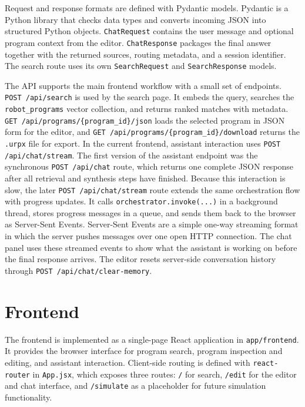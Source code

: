 Request and response formats are defined with Pydantic models. Pydantic is a Python library that checks data types and converts incoming JSON into structured Python objects. \texttt{ChatRequest} contains the user message and optional program context from the editor. \texttt{ChatResponse} packages the final answer together with the returned sources, routing metadata, and a session identifier. The search route uses its own \texttt{SearchRequest} and \texttt{SearchResponse} models.

The API supports the main frontend workflow with a small set of endpoints. \texttt{POST /api/search} is used by the search page. It embeds the query, searches the \texttt{robot\_programs} vector collection, and returns ranked matches with metadata. \verb|GET /api/programs/{program_id}/json| loads the selected program in JSON form for the editor, and \verb|GET /api/programs/{program_id}/download| returns the \texttt{.urpx} file for export. In the current frontend, assistant interaction uses \texttt{POST /api/chat/stream}. The first version of the assistant endpoint was the synchronous \texttt{POST /api/chat} route, which returns one complete JSON response after all retrieval and synthesis steps have finished. Because this interaction is slow, the later \texttt{POST /api/chat/stream} route extends the same orchestration flow with progress updates. It calls \texttt{orchestrator.invoke(...)} in a background thread, stores progress messages in a queue, and sends them back to the browser as Server-Sent Events. Server-Sent Events are a simple one-way streaming format in which the server pushes messages over one open HTTP connection. The chat panel uses these streamed events to show what the assistant is working on before the final response arrives. The editor resets server-side conversation history through \texttt{POST /api/chat/clear-memory}.


\newpage
\section{Frontend}
The frontend is implemented as a single-page React application in \texttt{app/frontend}. It provides the browser interface for program search, program inspection and editing, and assistant interaction. Client-side routing is defined with \texttt{react-router} in \texttt{App.jsx}, which exposes three routes: \texttt{/} for search, \texttt{/edit} for the editor and chat interface, and \texttt{/simulate} as a placeholder for future simulation functionality.

